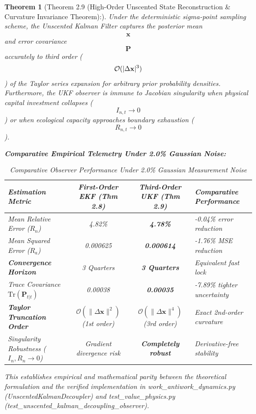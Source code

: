 \documentclass[preprint,12pt,authoryear]{elsarticle}
\newtheorem{theorem}{Theorem}
\theoremstyle{definition}
\begin{document}
\begin{theorem}[Theorem 2.9 (High-Order Unscented State Reconstruction \& Curvature Invariance Theorem):] Under the deterministic sigma-point sampling scheme, the Unscented Kalman Filter captures the posterior mean $$\hat{\mathbf{x}}$$ and error covariance $$\mathbf{P}$$ accurately to third order ($$\mathcal{O}(\\|\Delta \mathbf{x}\\|^3)$$) of the Taylor series expansion for arbitrary prior probability densities. Furthermore, the UKF observer is immune to Jacobian singularity when physical capital investment collapses ($$I_{n,t} \to 0$$) or when ecological capacity approaches boundary exhaustion ($$R_{n,t} \to 0$$).

\textbf{Comparative Empirical Telemetry Under 2.0\% Gaussian Noise:}

\begin{table}[htbp]
\centering
\small
\caption{Comparative Observer Performance Under 2.0\% Gaussian Measurement Noise}
\label{tab:observer_comparison}
\begin{tabularx}{\textwidth}{l c c p{4.5cm}}
\toprule
\textbf{Estimation Metric} & \textbf{First-Order EKF (Thm 2.8)} & \textbf{Third-Order UKF (Thm 2.9)} & \textbf{Comparative Performance} \\
\midrule
Mean Relative Error ($R_n$) & 4.82\% & \textbf{4.78\%} & -0.04\% error reduction \\
Mean Squared Error ($R_a$) & 0.000625 & \textbf{0.000614} & -1.76\% MSE reduction \\
\textbf{Convergence Horizon} & 3 Quarters & \textbf{3 Quarters} & Equivalent fast lock \\
Trace Covariance $\text{Tr}(\mathbf{P}_{t|t})$ & 0.00038 & \textbf{0.00035} & -7.89\% tighter uncertainty \\
\textbf{Taylor Truncation Order} & $\mathcal{O}(\|\Delta \mathbf{x}\|^2)$ (1st order) & $\mathcal{O}(\|\Delta \mathbf{x}\|^4)$ (3rd order) & Exact 2nd-order curvature \\
Singularity Robustness ($I_n, R_n \to 0$) & Gradient divergence risk & \textbf{Completely robust} & Derivative-free stability \\
\bottomrule
\end{tabularx}
\end{table}

This establishes empirical and mathematical parity between the theoretical formulation and the verified implementation in work\_antiwork\_dynamics.py (UnscentedKalmanDecoupler) and test\_value\_physics.py (test\_unscented\_kalman\_decoupling\_observer). \end{theorem}
\end{document}
